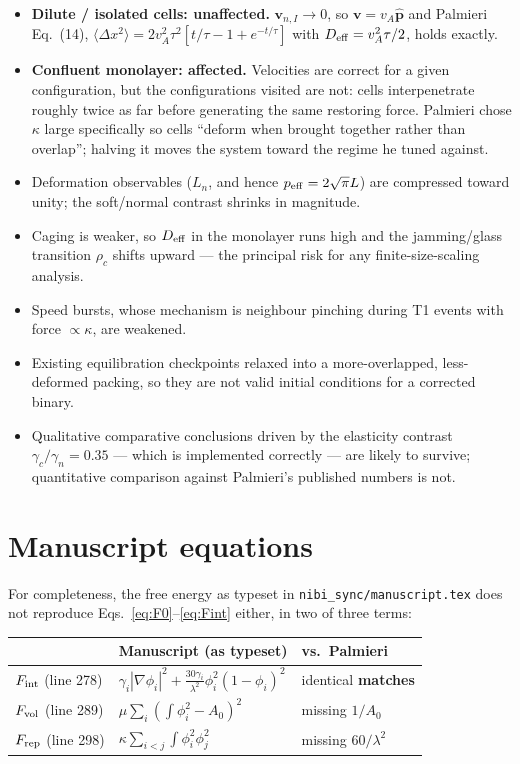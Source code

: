\documentclass[11pt]{article}
\newcommand{\OK}{{\color{blue}\textbf{matches}}}
\begin{document}
\begin{itemize}
\item \textbf{Dilute / isolated cells: unaffected.} $\mathbf v_{n,I}\to0$, so
  $\mathbf v = v_A\hat{\mathbf p}$ and Palmieri Eq.~(14),
  $\langle\Delta x^2\rangle = 2v_A^2\tau^2[t/\tau - 1 + e^{-t/\tau}]$ with
  $D_{\rm eff}=v_A^2\tau/2$, holds exactly.
\item \textbf{Confluent monolayer: affected.} Velocities are correct for a
  given configuration, but the configurations visited are not: cells
  interpenetrate roughly twice as far before generating the same restoring
  force. Palmieri chose $\kappa$ large specifically so cells ``deform when
  brought together rather than overlap''; halving it moves the system toward
  the regime he tuned against.
\item Deformation observables ($L_n$, and hence $p_{\rm eff}=2\sqrt{\pi}L$)
  are compressed toward unity; the soft/normal contrast shrinks in magnitude.
\item Caging is weaker, so $D_{\rm eff}$ in the monolayer runs high and the
  jamming/glass transition $\rho_c$ shifts upward --- the principal risk for
  any finite-size-scaling analysis.
\item Speed bursts, whose mechanism is neighbour pinching during T1 events
  with force $\propto\kappa$, are weakened.
\item Existing equilibration checkpoints relaxed into a more-overlapped,
  less-deformed packing, so they are not valid initial conditions for a
  corrected binary.
\item Qualitative comparative conclusions driven by the elasticity contrast
  $\gamma_c/\gamma_n=0.35$ --- which is implemented correctly --- are likely
  to survive; quantitative comparison against Palmieri's published numbers is
  not.
\end{itemize}

\section{Manuscript equations}

For completeness, the free energy as typeset in
\texttt{nibi\_sync/manuscript.tex} does not reproduce
Eqs.~\eqref{eq:F0}--\eqref{eq:Fint} either, in two of three terms:

\begin{center}\small
\begin{tabular}{lll}
\toprule
& Manuscript (as typeset) & vs.\ Palmieri \\
\midrule
$F_{\rm int}$ (line 278) & $\gamma_i|\nabla\phi_i|^2 + \tfrac{30\gamma_i}{\lambda^2}\phi_i^2(1-\phi_i)^2$ & identical \OK \\
$F_{\rm vol}$ (line 289) & $\mu\sum_i\left(\int\phi_i^2 - A_0\right)^2$ & missing $1/A_0$ \\
$F_{\rm rep}$ (line 298) & $\kappa\sum_{i<j}\int\phi_i^2\phi_j^2$ & missing $60/\lambda^2$ \\
\bottomrule
\end{tabular}
\end{center}
\end{document}
